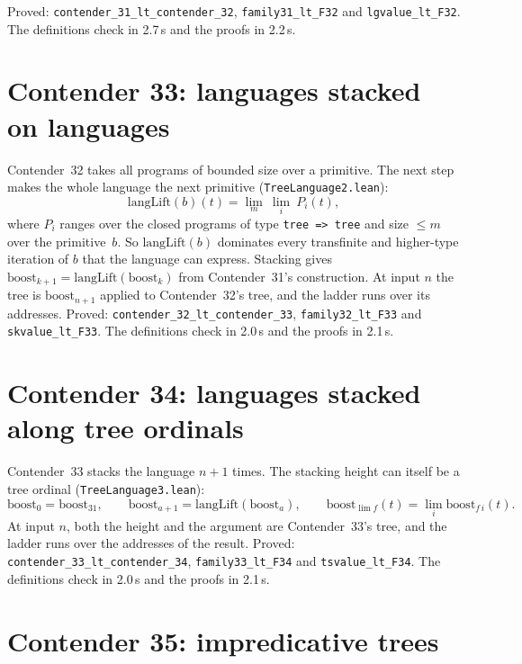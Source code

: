 \documentclass[11pt]{article}
\theoremstyle{definition}
\theoremstyle{remark}
\newcommand{\lean}[1]{\texttt{#1}}
\begin{document}
Proved: \lean{contender\_31\_lt\_\allowbreak contender\_32}, \lean{family31\_lt\_F32}
and \lean{lgvalue\_lt\_F32}. The definitions check in 2.7\,s and the proofs in
2.2\,s.

\section{Contender 33: languages stacked on languages}

Contender~32 takes all programs of bounded size over a primitive. The next step
makes the whole language the next primitive (\lean{TreeLanguage2.lean}):
\[
\mathrm{langLift}(b)(t)=\lim_m\ \lim_i\ P_i(t),
\]
where $P_i$ ranges over the closed programs of type \lean{tree => tree} and size
$\le m$ over the primitive~$b$. So $\mathrm{langLift}(b)$ dominates every
transfinite and higher-type iteration of $b$ that the language can express.
Stacking gives $\mathrm{boost}_{k+1}=\mathrm{langLift}(\mathrm{boost}_k)$ from
Contender~31's construction. At input $n$ the tree is
$\mathrm{boost}_{n+1}$ applied to Contender~32's tree, and the ladder runs over
its addresses. Proved: \lean{contender\_32\_lt\_\allowbreak contender\_33},
\lean{family32\_lt\_F33} and \lean{skvalue\_lt\_F33}. The definitions check in
2.0\,s and the proofs in 2.1\,s.

\section{Contender 34: languages stacked along tree ordinals}

Contender~33 stacks the language $n{+}1$ times. The stacking height can
itself be a tree ordinal (\lean{TreeLanguage3.lean}):
\[
\mathrm{boost}_0=\mathrm{boost}_{31},\qquad
\mathrm{boost}_{a+1}=\mathrm{langLift}(\mathrm{boost}_a),\qquad
\mathrm{boost}_{\lim f}(t)=\lim_i \mathrm{boost}_{f\,i}(t).
\]
At input $n$, both the height and the argument are Contender~33's tree, and the
ladder runs over the addresses of the result. Proved:
\lean{contender\_33\_lt\_\allowbreak contender\_34}, \lean{family33\_lt\_F34} and
\lean{tsvalue\_lt\_F34}. The definitions check in 2.0\,s and the proofs in 2.1\,s.

\section{Contender 35: impredicative trees}
\end{document}
